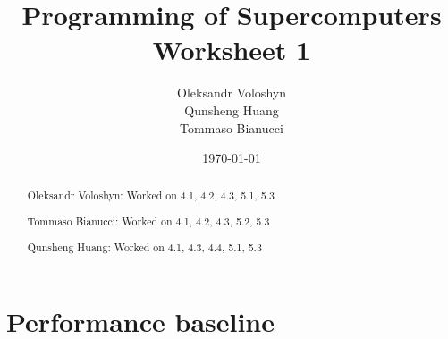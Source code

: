 \documentclass{article}
\title{Programming of Supercomputers\\Worksheet 1}
\author{Oleksandr Voloshyn\\ Qunsheng Huang\\ Tommaso Bianucci}
\date{\today}
\begin{document}
\maketitle
\renewcommand{\abstractname}{Group members's contributions}
\begin{abstract}
	Oleksandr Voloshyn: Worked on 4.1, 4.2, 4.3, 5.1, 5.3

	Tommaso Bianucci: Worked on 4.1, 4.2, 4.3, 5.2, 5.3
	
	Qunsheng Huang: Worked on 4.1, 4.3, 4.4, 5.1, 5.3
\end{abstract}

\section{Performance baseline} %
\end{document}

